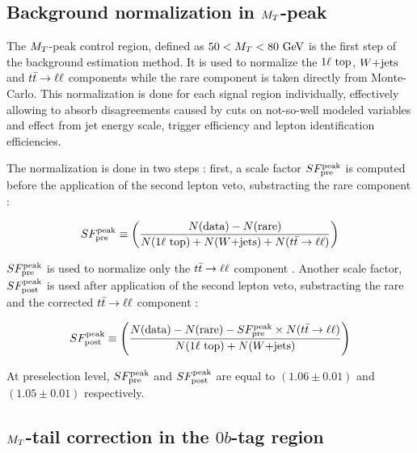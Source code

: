 
        \subsection{Background normalization in $M_T$-peak \label{sec:MTpeakNormalization}}

            The $M_T$-peak control region, defined as $50 < M_T < 80 ~\text{GeV}$ is the first step of the
            background estimation method. It is used to normalize the $1\ell~\text{top}$, $\text{$W$+jets}$ and
            $t\bar{t} \rightarrow \ell \ell$ components while the rare component is taken directly from Monte-Carlo.
            This normalization is done for each signal region individually, effectively allowing to
            absorb disagreements caused by cuts on not-so-well modeled variables and effect from jet
            energy scale, trigger efficiency and lepton identification efficiencies. 

            The normalization is done in two steps : first, a scale factor $SF_{\text{pre}}^{\text{peak}}$ is
            computed before the application of the second lepton veto, substracting the rare component :

            \begin{equation}
                SF_{\text{pre}}^{\text{peak}} \equiv \left( \frac{N(\text{data}) - N(\text{rare})}{N(1\ell~\text{top}) + N(\text{$W$+jets}) + N(t\bar{t} \rightarrow \ell \ell)} \right)
                \label{eq:SFpreDefinition}
            \end{equation}

            $SF_{\text{pre}}^{\text{peak}}$ is used to normalize only the $t\bar{t} \rightarrow \ell \ell$ component . Another scale factor, $SF_{\text{post}}^{\text{peak}}$ is used after application of the second lepton veto, substracting the rare and the corrected $t\bar{t} \rightarrow \ell \ell$ component :

            \begin{equation}
                SF_{\text{post}}^{\text{peak}} \equiv \left( \frac{N(\text{data}) - N(\text{rare}) - SF_{\text{pre}}^{\text{peak}} \times N(t\bar{t} \rightarrow \ell \ell)}{N(1\ell~\text{top}) + N(\text{$W$+jets})} \right)
                \label{eq:SFpostDefinition}
            \end{equation}

            At preselection level, $SF_{\text{pre}}^{\text{peak}}$ and $SF_{\text{post}}^{\text{peak}}$ are equal to $(1.06 \pm 0.01)$ and $(1.05 \pm 0.01)$ respectively.

        \subsection{$M_T$-tail correction in the $0b$-tag region \label{sec:MTtailCorrection}}
        \loremipsum

